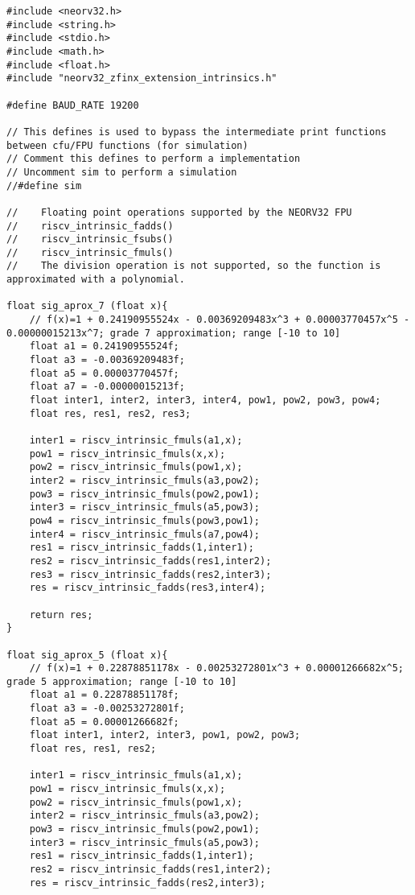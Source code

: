 \begin{code}
\begin{verbatim}
#include <neorv32.h>
#include <string.h>
#include <stdio.h>
#include <math.h>
#include <float.h>
#include "neorv32_zfinx_extension_intrinsics.h"

#define BAUD_RATE 19200

// This defines is used to bypass the intermediate print functions between cfu/FPU functions (for simulation)
// Comment this defines to perform a implementation
// Uncomment sim to perform a simulation
//#define sim

//    Floating point operations supported by the NEORV32 FPU
//    riscv_intrinsic_fadds()
//    riscv_intrinsic_fsubs()
//    riscv_intrinsic_fmuls()
//    The division operation is not supported, so the function is approximated with a polynomial.

float sig_aprox_7 (float x){
    // f(x)=1 + 0.24190955524x - 0.00369209483x^3 + 0.00003770457x^5 - 0.00000015213x^7; grade 7 approximation; range [-10 to 10]
    float a1 = 0.24190955524f;
    float a3 = -0.00369209483f;
    float a5 = 0.00003770457f;
    float a7 = -0.00000015213f;
    float inter1, inter2, inter3, inter4, pow1, pow2, pow3, pow4;
    float res, res1, res2, res3;
    
    inter1 = riscv_intrinsic_fmuls(a1,x);
    pow1 = riscv_intrinsic_fmuls(x,x);
    pow2 = riscv_intrinsic_fmuls(pow1,x);
    inter2 = riscv_intrinsic_fmuls(a3,pow2);
    pow3 = riscv_intrinsic_fmuls(pow2,pow1);
    inter3 = riscv_intrinsic_fmuls(a5,pow3);
    pow4 = riscv_intrinsic_fmuls(pow3,pow1);
    inter4 = riscv_intrinsic_fmuls(a7,pow4);
    res1 = riscv_intrinsic_fadds(1,inter1);
    res2 = riscv_intrinsic_fadds(res1,inter2);
    res3 = riscv_intrinsic_fadds(res2,inter3);
    res = riscv_intrinsic_fadds(res3,inter4);
    
    return res;
}

float sig_aprox_5 (float x){
    // f(x)=1 + 0.22878851178x - 0.00253272801x^3 + 0.00001266682x^5; grade 5 approximation; range [-10 to 10]
    float a1 = 0.22878851178f;
    float a3 = -0.00253272801f;
    float a5 = 0.00001266682f;
    float inter1, inter2, inter3, pow1, pow2, pow3;
    float res, res1, res2;
    
    inter1 = riscv_intrinsic_fmuls(a1,x);
    pow1 = riscv_intrinsic_fmuls(x,x);
    pow2 = riscv_intrinsic_fmuls(pow1,x);
    inter2 = riscv_intrinsic_fmuls(a3,pow2);
    pow3 = riscv_intrinsic_fmuls(pow2,pow1);
    inter3 = riscv_intrinsic_fmuls(a5,pow3);
    res1 = riscv_intrinsic_fadds(1,inter1);
    res2 = riscv_intrinsic_fadds(res1,inter2);
    res = riscv_intrinsic_fadds(res2,inter3);
    

\end{verbatim}
\end{code}
